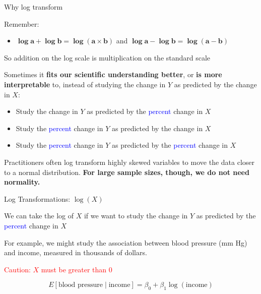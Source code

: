 \documentclass[10pt,t]{beamer}
\begin{document}
\begin{frame}{Why log transform}
	
	\vspace{-5 mm}
	
	Remember:
	\begin{itemize}
		\medskip
		\item $\mathbf{\log a +  \log b = \log(a\times b)}$ and $\mathbf{\log a - \log b = \log(a-  b)}$
	\end{itemize}
\medskip
So addition on the log scale is multiplication on the standard scale
\medskip

Sometimes it \textbf{fits our scientific understanding better}, or \textbf{is more interpretable} to, instead of studying the change in $Y$ as predicted by the change in $X$:

\medskip
\begin{itemize}
	\item Study the change in $Y$ as predicted by the \textcolor{blue}{percent} change in $X$
	\medskip
	\item Study the \textcolor{blue}{percent} change in $Y$  as predicted by  the change in $X$
	\medskip
	\item Study the \textcolor{blue}{percent} change in $Y$  as predicted by the \textcolor{blue}{percent} change in $X$
\end{itemize}
\bigskip


\small{Practitioners often log transform highly skewed variables to move the data closer to a normal distribution. \textbf{For large sample sizes, though, we do not need normality.}} 


\end{frame}

\begin{frame}{Log Transformations: $\log(X)$}
	
	We can take the log of $X$ if we want to study the change in $Y$ as predicted by the \textcolor{blue}{percent} change in $X$
	\medskip
	
	For example, we might study the association between blood pressure (mm Hg) and income, measured in thousands of dollars. \pause
	\medskip
	
	\textcolor{red}{Caution: $X$ must be greater than 0} \pause
	
	$$
	E[\text{blood pressure} \mid \text{income}] = \beta_0 + \beta_1 \log(\text{income})
	$$
	
\end{frame}
\end{document}
